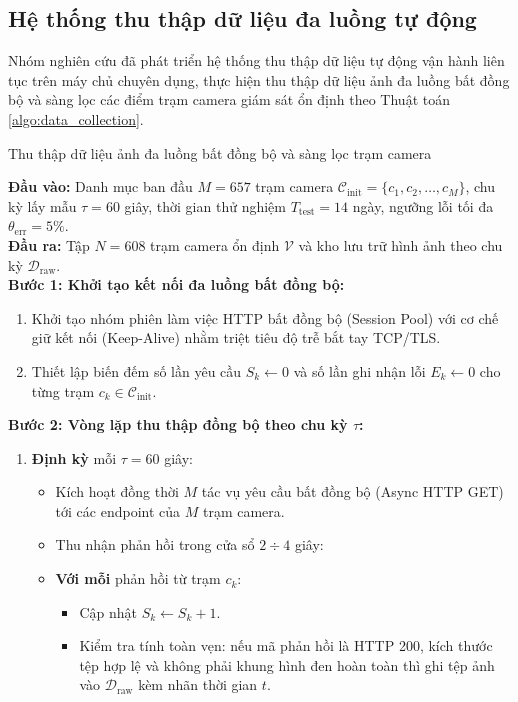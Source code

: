 \subsection{Hệ thống thu thập dữ liệu đa luồng tự động}
Nhóm nghiên cứu đã phát triển hệ thống thu thập dữ liệu tự động vận hành liên tục trên máy chủ chuyên dụng, thực hiện thu thập dữ liệu ảnh đa luồng bất đồng bộ và sàng lọc các điểm trạm camera giám sát ổn định theo Thuật toán \ref{algo:data_collection}.
\begin{algorithm_box}{Thu thập dữ liệu ảnh đa luồng bất đồng bộ và sàng lọc trạm camera}{
\textbf{Đầu vào:} Danh mục ban đầu $M=657$ trạm camera $\mathcal{C}_{\text{init}} = \{c_1, c_2, \dots, c_M\}$, chu kỳ lấy mẫu $\tau = 60$ giây, thời gian thử nghiệm $T_{\text{test}} = 14$ ngày, ngưỡng lỗi tối đa $\theta_{\text{err}} = 5\%$. \\
\textbf{Đầu ra:} Tập $N=608$ trạm camera ổn định $\mathcal{V}$ và kho lưu trữ hình ảnh theo chu kỳ $\mathcal{D}_{\text{raw}}$. \\
\textbf{Bước 1: Khởi tạo kết nối đa luồng bất đồng bộ:}
\begin{enumerate}
    \item Khởi tạo nhóm phiên làm việc HTTP bất đồng bộ (Session Pool) với cơ chế giữ kết nối (Keep-Alive) nhằm triệt tiêu độ trễ bắt tay TCP/TLS.
    \item Thiết lập biến đếm số lần yêu cầu $S_k \gets 0$ và số lần ghi nhận lỗi $E_k \gets 0$ cho từng trạm $c_k \in \mathcal{C}_{\text{init}}$.
\end{enumerate}
\textbf{Bước 2: Vòng lặp thu thập đồng bộ theo chu kỳ $\tau$:}
\begin{enumerate}
    \item \textbf{Định kỳ} mỗi $\tau = 60$ giây:
    \begin{itemize}
        \item Kích hoạt đồng thời $M$ tác vụ yêu cầu bất đồng bộ (Async HTTP GET) tới các endpoint của $M$ trạm camera.
        \item Thu nhận phản hồi trong cửa sổ $2 \div 4$ giây:
        \item \textbf{Với mỗi} phản hồi từ trạm $c_k$:
        \begin{itemize}
            \item Cập nhật $S_k \gets S_k + 1$.
            \item Kiểm tra tính toàn vẹn: nếu mã phản hồi là HTTP 200, kích thước tệp hợp lệ và không phải khung hình đen hoàn toàn thì ghi tệp ảnh vào $\mathcal{D}_{\text{raw}}$ kèm nhãn thời gian $t$.

\end{itemize}
\end{itemize}
\end{enumerate}}
\end{algorithm_box}
